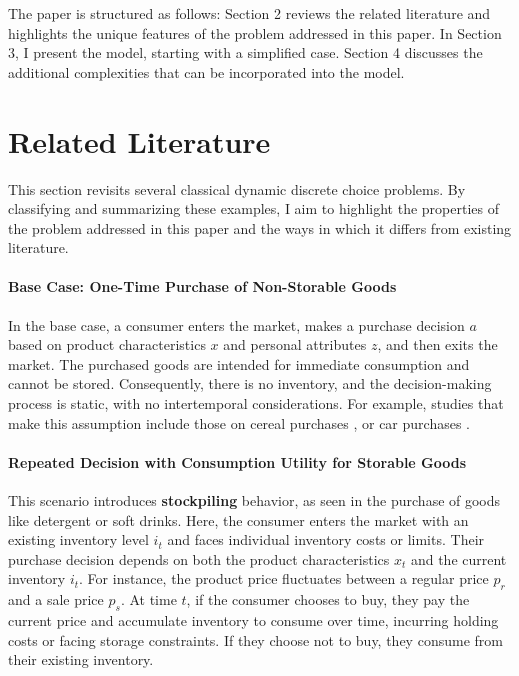 \documentclass[12pt]{article}
\begin{document}
The paper is structured as follows: Section 2 reviews the related literature
and highlights the unique features of the problem addressed in this paper. In
Section 3, I present the model, starting with a simplified case. Section 4
discusses the additional complexities that can be incorporated into the model.

\section{Related Literature}
This section revisits several classical dynamic discrete choice problems. By
classifying and summarizing these examples, I aim to highlight the properties
of the problem addressed in this paper and the ways in which it differs from
existing literature.

\paragraph{Base Case: One-Time Purchase of Non-Storable Goods}
In the base case, a consumer enters the market, makes a purchase decision \(a\)
based on product characteristics \(x\) and personal attributes \(z\), and then
exits the market. The purchased goods are intended for immediate consumption
and cannot be stored. Consequently, there is no inventory, and the
decision-making process is static, with no intertemporal considerations. For
example, studies that make this assumption include those on cereal purchases
\citep{nevo2001measuring}, or car purchases \citep{berry1995automobile}.

\paragraph{Repeated Decision with Consumption Utility for Storable Goods}
This scenario introduces \textbf{stockpiling} behavior, as seen in the purchase
of goods like detergent \citep{hendel2006measuring} or soft drinks. Here, the
consumer enters the market with an existing inventory level \(i_t\) and faces
individual inventory costs or limits. Their purchase decision depends on both
the product characteristics \(x_t\) and the current inventory \(i_t\). For
instance, the product price fluctuates between a regular price \(p_r\) and a
sale price \(p_s\). At time \(t\), if the consumer chooses to buy, they pay the
current price and accumulate inventory to consume over time, incurring holding
costs or facing storage constraints. If they choose not to buy, they consume
from their existing inventory.
\end{document}
